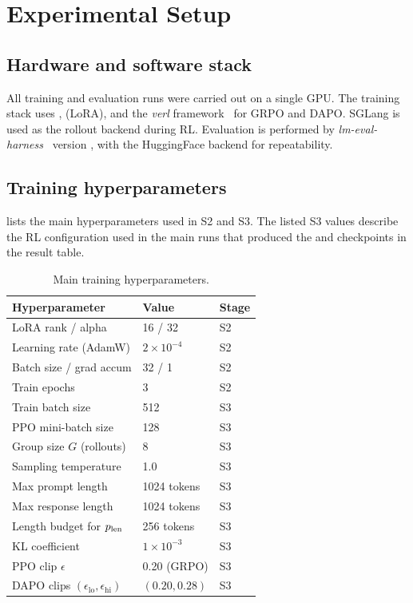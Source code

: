 \section{Experimental Setup}
\label{sec:exp}

\subsection{Hardware and software stack}
All training and evaluation runs were carried out on a single
 GPU. The training stack uses
,  (LoRA), and the
\emph{verl} framework~\cite{verl} for GRPO and DAPO. SGLang is used as the
rollout backend during RL. Evaluation is performed by
\emph{lm-eval-harness}~\cite{lmevalharness} version , with the
HuggingFace backend for repeatability.

\subsection{Training hyperparameters}
 lists the main hyperparameters used in S2 and S3. The
listed S3 values describe the RL configuration used in the main runs that
produced the  and  checkpoints in the result table.

\begin{table}[h]
\centering
\small
\begin{tabularx}{\linewidth}{lXl}
\toprule
\textbf{Hyperparameter} & \textbf{Value} & \textbf{Stage} \\
\midrule
LoRA rank / alpha          & 16 / 32                 & S2 \\
Learning rate (AdamW)      & $2{\times}10^{-4}$      & S2 \\
Batch size / grad accum    & 32 / 1                  & S2 \\
Train epochs               & 3                       & S2 \\
\midrule
Train batch size           & 512                     & S3 \\
PPO mini-batch size        & 128                     & S3 \\
Group size $G$ (rollouts)  & 8                       & S3 \\
Sampling temperature       & 1.0                     & S3 \\
Max prompt length          & 1024 tokens             & S3 \\
Max response length        & 1024 tokens             & S3 \\
Length budget for $p_{\text{len}}$  & 256 tokens              & S3 \\
KL coefficient             & $1{\times}10^{-3}$      & S3 \\
PPO clip $\epsilon$        & 0.20 (GRPO)             & S3 \\
DAPO clips $(\epsilon_{\text{lo}}, \epsilon_{\text{hi}})$ & $(0.20, 0.28)$ & S3 \\
\bottomrule
\end{tabularx}
\caption{Main training hyperparameters.}
\label{tab:hparams}
\end{table}

